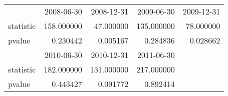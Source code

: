 \begin{tabular}{lrrrr}
    \toprule
    {}        & 2008-06-30 & 2008-12-31 & 2009-06-30 & 2009-12-31 \\
    statistic & 158.000000 & 47.000000  & 135.000000 & 78.000000  \\
    pvalue    & 0.230442   & 0.005167   & 0.284836   & 0.028662   \\
    \midrule
    {}        & 2010-06-30 & 2010-12-31 & 2011-06-30 &            \\
    statistic & 182.000000 & 131.000000 & 217.000000 &            \\
    pvalue    & 0.443427   & 0.091772   & 0.892414   &            \\
    \bottomrule
\end{tabular}
